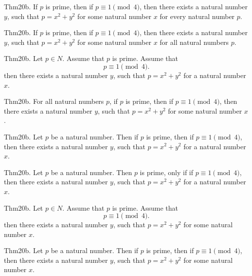 \documentclass{article}
\begin{document}
Thm20b. If $p$ is prime, then if $p \equiv 1 \pmod{ 4}$, then there exists a natural number $y$, such that $p = x ^{ 2}+ y ^{ 2}$ for some natural number $x$ for every natural number $p$.

Thm20b. If $p$ is prime, then if $p \equiv 1 \pmod{ 4}$, then there exists a natural number $y$, such that $p = x ^{ 2}+ y ^{ 2}$ for some natural number $x$ for all natural numbers $p$.

Thm20b. Let $p \in N$. Assume that $p$ is prime. Assume that $$p \equiv 1 \pmod{ 4}.$$ then there exists a natural number $y$, such that $p = x ^{ 2}+ y ^{ 2}$ for a natural number $x$.

Thm20b. For all natural numbers $p$, if $p$ is prime, then if $p \equiv 1 \pmod{ 4}$, then there exists a natural number $y$, such that $p = x ^{ 2}+ y ^{ 2}$ for some natural number $x$.

Thm20b. Let $p$ be a natural number. Then if $p$ is prime, then if $p \equiv 1 \pmod{ 4}$, then there exists a natural number $y$, such that $p = x ^{ 2}+ y ^{ 2}$ for a natural number $x$.

Thm20b. Let $p$ be a natural number. Then $p$ is prime, only if if $p \equiv 1 \pmod{ 4}$, then there exists a natural number $y$, such that $p = x ^{ 2}+ y ^{ 2}$ for a natural number $x$.

Thm20b. Let $p \in N$. Assume that $p$ is prime. Assume that $$p \equiv 1 \pmod{ 4}.$$ then there exists a natural number $y$, such that $p = x ^{ 2}+ y ^{ 2}$ for some natural number $x$.

Thm20b. Let $p$ be a natural number. Then if $p$ is prime, then if $p \equiv 1 \pmod{ 4}$, then there exists a natural number $y$, such that $p = x ^{ 2}+ y ^{ 2}$ for some natural number $x$.
\end{document}
